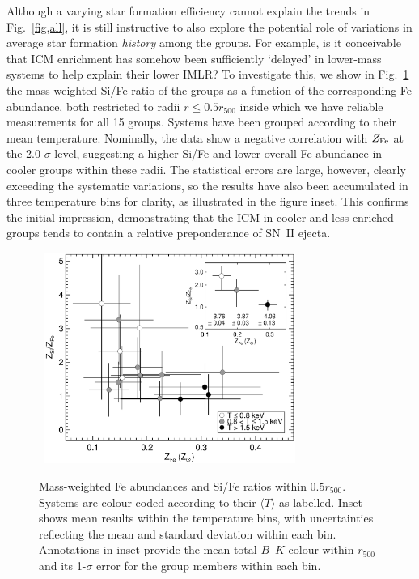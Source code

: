 \documentclass[useAMS,usenatbib]{mn2e}
\begin{document}
Although a varying star formation efficiency cannot explain the trends
in Fig.~\ref{fig,all}, it is still instructive to also explore the
potential role of variations in average star formation {\em history}
among the groups. For example, is it conceivable that ICM enrichment
has somehow been sufficiently `delayed' in lower-mass systems to help
explain their lower IMLR? To investigate this, we show in
Fig.~\ref{fig,SiFe} the mass-weighted Si/Fe ratio of the groups as a
function of the corresponding Fe abundance, both restricted to radii
$r\le 0.5 r_{500}$ inside which we have reliable measurements for all
15 groups. Systems have been grouped according to their mean
temperature. Nominally, the data show a negative correlation with
$Z_{\rm Fe}$ at the 2.0-$\sigma$ level, suggesting a higher Si/Fe and
lower overall Fe abundance in cooler groups within these radii. The
statistical errors are large, however, clearly exceeding the
systematic variations, so the results have also been accumulated in
three temperature bins for clarity, as illustrated in the figure
inset. This confirms the initial impression, demonstrating that the
ICM in cooler and less enriched groups tends to contain a relative
preponderance of SN~II ejecta.
\begin{figure} 
\mbox{\hspace{0mm} 
 \includegraphics[width=82mm]{fig14.eps}}
 \caption{Mass-weighted Fe abundances and Si/Fe ratios within
  $0.5r_{500}$.  Systems are colour-coded according to their $\langle
  T\rangle$ as labelled. Inset shows mean results within the
  temperature bins, with uncertainties reflecting the mean and
  standard deviation within each bin. Annotations in inset provide the
  mean total $B$--$K$ colour within $r_{500}$ and its 1-$\sigma$ error
  for the group members within each bin.}
\label{fig,SiFe} 
\end{figure} 
\end{document}
